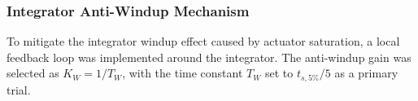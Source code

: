 \subsubsection{Integrator Anti-Windup Mechanism}
To mitigate the integrator windup effect caused by actuator saturation, a local feedback loop was implemented around the integrator. The anti-windup gain was selected as $K_W = 1/T_W$, with the time constant $T_W$ set to $t_{s,5\%}/5$ as a primary trial. 

